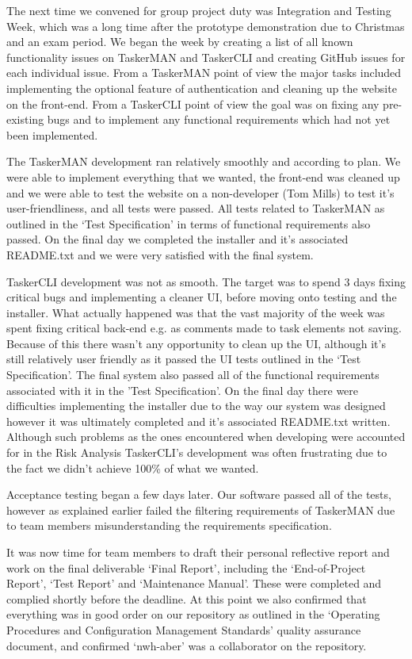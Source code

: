 \documentclass{project}
\begin{document}
The next time we convened for group project duty was Integration and Testing Week, which was a long time after the prototype demonstration due to Christmas and an exam period. We began the week by creating a list of all known functionality issues on TaskerMAN and TaskerCLI and creating GitHub issues for each individual issue. From a TaskerMAN point of view the major tasks included implementing the optional feature of authentication and cleaning up the website on the front-end. From a TaskerCLI point of view the goal was on fixing any pre-existing bugs and to implement any functional requirements which had not yet been implemented.

The TaskerMAN development ran relatively smoothly and according to plan. We were able to implement everything that we wanted, the front-end was cleaned up and we were able to test the website on a non-developer (Tom Mills) to test it's user-friendliness, and all tests were passed. All tests related to TaskerMAN as outlined in the  `Test Specification'\cite{se.qa.ts} in terms of functional requirements also passed. On the final day we completed the installer and it's associated README.txt and we were very satisfied with the final system.

TaskerCLI development was not as smooth. The target was to spend 3 days fixing critical bugs and implementing a cleaner UI, before moving onto testing and the installer. What actually happened was that the vast majority of the week was spent fixing critical back-end e.g. as comments made to task elements not saving. Because of this there wasn't any opportunity to clean up the UI, although it's still relatively user friendly as it passed the UI tests outlined in the  `Test Specification'. The final system also passed all of the functional requirements associated with it in the 'Test Specification'. On the final day there were difficulties implementing the installer due to the way our system was designed\cite{se.qa.ds} however it was ultimately completed and it's associated README.txt written. Although such problems as the ones encountered when developing were accounted for in the Risk Analysis TaskerCLI's development was often frustrating due to the fact we didn't achieve 100\% of what we wanted.

Acceptance testing began a few days later. Our software passed all of the tests, however as explained earlier failed the filtering requirements of TaskerMAN due to team members misunderstanding the requirements specification.

It was now time for team members to draft their personal reflective report and work on the final deliverable  `Final Report', including the  `End-of-Project Report',  `Test Report' and `Maintenance Manual'. These were completed and complied shortly before the deadline. At this point we also confirmed that everything was in good order on our repository as outlined in the `Operating Procedures and Configuration Management Standards' quality assurance document, and confirmed `nwh-aber' was a collaborator on the repository.
\end{document}
